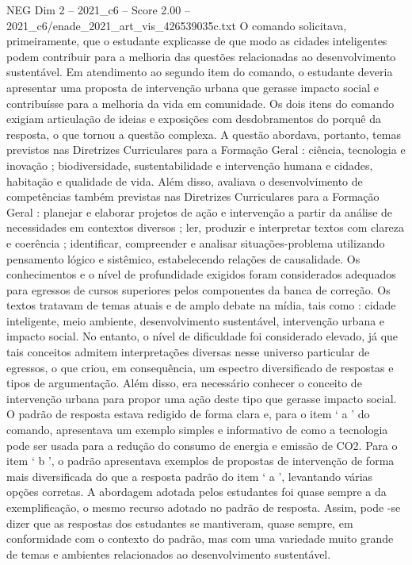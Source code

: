 \begin{textsample}{NEG Dim 2 – 2021\_c6 – Score 2.00 – 2021\_c6/enade\_2021\_art\_vis\_426539035c.txt}
O comando solicitava, primeiramente, que o estudante explicasse de que modo as cidades inteligentes podem contribuir para a melhoria das questões relacionadas ao desenvolvimento sustentável.
Em atendimento ao segundo item do comando, o estudante deveria apresentar uma proposta de intervenção urbana que gerasse impacto social e contribuísse para a melhoria da vida em comunidade.
Os dois itens do comando exigiam articulação de ideias e exposições com desdobramentos do porquê da resposta, o que tornou a questão complexa.
A questão abordava, portanto, temas previstos nas Diretrizes Curriculares para a Formação Geral : ciência, tecnologia e inovação ; biodiversidade, sustentabilidade e intervenção humana e cidades, habitação e qualidade de vida.
Além disso, avaliava o desenvolvimento de competências também previstas nas Diretrizes Curriculares para a Formação Geral : planejar e elaborar projetos de ação e intervenção a partir da análise de necessidades em contextos diversos ; ler, produzir e interpretar textos com clareza e coerência ; identificar, compreender e analisar situações-problema utilizando pensamento lógico e sistêmico, estabelecendo relações de causalidade.
Os conhecimentos e o nível de profundidade exigidos foram considerados adequados para egressos de cursos superiores pelos componentes da banca de correção.
Os textos tratavam de temas atuais e de amplo debate na mídia, tais como : cidade inteligente, meio ambiente, desenvolvimento sustentável, intervenção urbana e impacto social.
No entanto, o nível de dificuldade foi considerado elevado, já que tais conceitos admitem interpretações diversas nesse universo particular de egressos, o que criou, em consequência, um espectro diversificado de respostas e tipos de argumentação.
Além disso, era necessário conhecer o conceito de intervenção urbana para propor uma ação deste tipo que gerasse impacto social.
O padrão de resposta estava redigido de forma clara e, para o item ‘ a ’ do comando, apresentava um exemplo simples e informativo de como a tecnologia pode ser usada para a redução do consumo de energia e emissão de CO2.
Para o item ‘ b ’, o padrão apresentava exemplos de propostas de intervenção de forma mais diversificada do que a resposta padrão do item ‘ a ’, levantando várias opções corretas.
A abordagem adotada pelos estudantes foi quase sempre a da exemplificação, o mesmo recurso adotado no padrão de resposta.
Assim, pode -se dizer que as respostas dos estudantes se mantiveram, quase sempre, em conformidade com o contexto do padrão, mas com uma variedade muito grande de temas e ambientes relacionados ao desenvolvimento sustentável.

\end{textsample}

